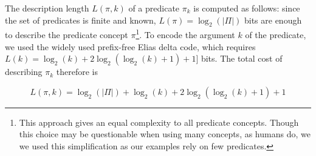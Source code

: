 \documentclass[entropy,article,submit,moreauthors,pdftex]{Definitions/mdpi}
\begin{document}


The description length $L(\pi, k)$ of a predicate $\pi_k$ is computed as follows: since the set of predicates is finite and known, $L(\pi) = \log_2(|\Pi|)$ bits are enough to describe the predicate concept $\pi$\footnote{This approach gives an equal complexity to all predicate concepts. Though this choice may be questionable when using many concepts, as humans do, we we used this simplification as our examples rely on few predicates.}. To encode the argument $k$ of the predicate, we used the widely used prefix-free Elias delta code\cite{elias_universal_1975}, which requires $L(k) = \log_2(k) + 2 \log_2(\log_2(k)+1) + 1]$ bits. The total cost of describing $\pi_{k}$ therefore is

\begin{equation}
    \label{eq:pred_cost}
    L(\pi, k) = \log_2(|\Pi|) + \log_2(k) + 2 \log_2(\log_2(k) + 1) + 1
\end{equation}
\end{document}
